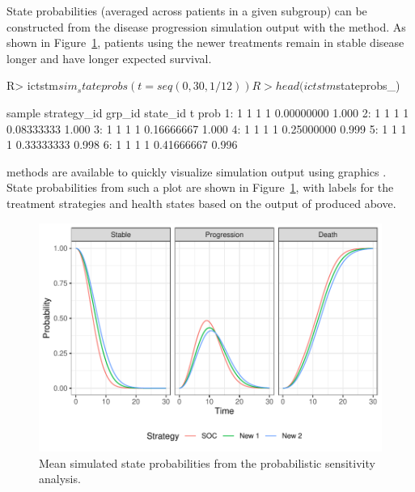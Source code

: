 \documentclass[article, nojss]{jss}\usepackage[]{graphicx}\usepackage[]{color}
\begin{document}
State probabilities (averaged across patients in a given subgroup) can be constructed from the disease progression simulation output with the  method. As shown in Figure~\ref{fig:ictstm-stprobs}, patients using the newer treatments remain in stable disease longer and have longer expected survival.  

\begin{Schunk}
\begin{Sinput}
R> ictstm$sim_stateprobs(t = seq(0, 30 , 1/12))
R> head(ictstm$stateprobs_)
\end{Sinput}
\begin{Soutput}
   sample strategy_id grp_id state_id          t  prob
1:      1           1      1        1 0.00000000 1.000
2:      1           1      1        1 0.08333333 1.000
3:      1           1      1        1 0.16666667 1.000
4:      1           1      1        1 0.25000000 0.999
5:      1           1      1        1 0.33333333 0.998
6:      1           1      1        1 0.41666667 0.996
\end{Soutput}
\end{Schunk}

 methods are available to quickly visualize simulation output using  graphics \citep{wickham2016ggplot2}. State probabilities from such a plot are shown in Figure~\ref{fig:ictstm-stprobs}, with labels for the treatment strategies and health states based on the output of  produced above.

\begin{Schunk}
\end{Schunk}

\begin{figure}[h]
\centering
\includegraphics{figure/ictstm_plot_stateprobs-1.pdf}
\caption{Mean simulated state probabilities from the probabilistic sensitivity analysis.} \label{fig:ictstm-stprobs}
\end{figure}
\end{document}
